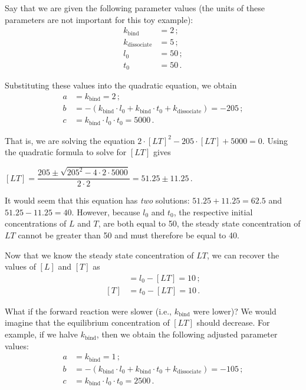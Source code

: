Say that we are given the following parameter values (the units of these parameters are not important for this toy example):
\begin{align*}
k_\text{bind} & = 2\,;\\
k_\text{dissociate} & = 5\,;\\
l_0 & = 50\,;\\
t_0 & = 50\,.
\end{align*}


\noindent Substituting these values into the quadratic equation, we obtain
\begin{align*}
a & = k_\text{bind} = 2\,;\\
b & = - (k_\text{bind} \cdot l_0 + k_\text{bind} \cdot t_0 + k_\text{dissociate}) = -205\,;\\
c & = k_\text{bind} \cdot l_0 \cdot t_0 = 5000\,.
\end{align*}

\noindent That is, we are solving the equation $2 \cdot [LT]^2 - 205 \cdot [LT] + 5000 = 0$. Using the quadratic formula to solve for $[LT]$ gives

\begin{center}
$[LT] = \dfrac{205 \pm \sqrt{205^2 - 4 \cdot 2 \cdot 5000}}{2 \cdot 2} = 51.25 \pm 11.25$\,.
\end{center}

It would seem that this equation has \textit{two} solutions: $51.25 + 11.25 = 62.5$ and $51.25 - 11.25 = 40$. However, because $l_0$ and $t_0$, the respective initial concentrations of $L$ and $T$, are both equal to 50, the steady state concentration of $LT$ cannot be greater than 50 and must therefore be equal to 40.

Now that we know the steady state concentration of $LT$, we can recover the values of $[L]$ and $[T]$ as
\begin{align*}
[L] & = l_0 - [LT] = 10\,;\\
[T] & = t_0 - [LT] = 10\,.
\end{align*}

What if the forward reaction were slower (i.e., $k_\text{bind}$ were lower)? We would imagine that the equilibrium concentration of $[LT]$ should decrease. For example, if we halve $k_\text{bind}$, then we obtain the following adjusted parameter values:
\begin{align*}
a & = k_\text{bind} = 1\,;\\
b & = - (k_\text{bind} \cdot l_0 + k_\text{bind} \cdot t_0 + k_\text{dissociate}) = -105\,;\\
c & = k_\text{bind} \cdot l_0 \cdot t_0 = 2500\,.
\end{align*}

